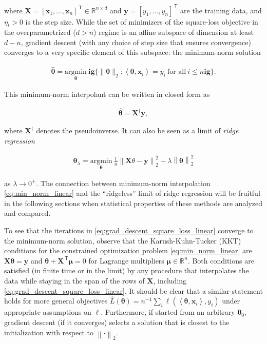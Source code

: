where ${\boldsymbol X} = [{\boldsymbol x}_1,\ldots,{\boldsymbol x}_n]^\ensuremath{{\scriptscriptstyle\mathsf{\,T}}}\in {\mathbb R}^{n\times d}$ and
${\boldsymbol y}=[y_1,\ldots,y_n]^\ensuremath{{\scriptscriptstyle\mathsf{\,T}}}$ are the training data, and $\eta_t>0$ is the step size. While the set of minimizers of the square-loss objective in the overparametrized ($d>n$) regime  is an affine subspace of dimension at least $d-n$, gradient descent (with any choice of step size that ensures convergence) converges to a very specific element of this subspace: the minimum-norm solution

\begin{align}
	\label{eq:min_norm_linear}
	\widehat{{\boldsymbol \theta}} = \underset{{\boldsymbol \theta}}{\mathrm{argmin}} \  \mathbf{ig}\{ \| {\boldsymbol \theta} \|_2: \left\langle {\boldsymbol \theta},{\boldsymbol x}_i \right\rangle = y_i ~\text{for all}~ i \leq n \mathbf{ig}\}.
\end{align}

This minimum-norm interpolant can be written in closed form as

\begin{align}
	\widehat{{\boldsymbol \theta}} = {\boldsymbol X}^\dagger {\boldsymbol y},
\end{align}

	
where ${\boldsymbol X}^\dagger$ denotes the pseudoinverse. It can also be seen as a limit of \emph{ridge regression}

\begin{align}
	\label{eq:reg_least_squares}
	{\boldsymbol \theta}_{\lambda} = \underset{{\boldsymbol \theta}}{\mathrm{argmin}} \  \frac{1}{n}\left\|{\boldsymbol X}\theta-{\boldsymbol y}\right\|^2_2 + \lambda\left\|{\boldsymbol \theta}\right\|^2_2
\end{align}

as $\lambda\to 0^+$. The connection between minimum-norm interpolation \eqref{eq:min_norm_linear} and the ``ridgeless'' limit of ridge regression will be fruitful in the following sections when statistical properties of these methods are analyzed and compared. 

To see that the iterations in
\eqref{eq:grad_descent_square_loss_linear} converge to the minimum-norm solution, observe that the Karush-Kuhn-Tucker (KKT) conditions for the constrained optimization problem \eqref{eq:min_norm_linear} are
${\boldsymbol X} {\boldsymbol \theta} = {\boldsymbol y}$ and ${\boldsymbol \theta}+{\boldsymbol X}^\ensuremath{{\scriptscriptstyle\mathsf{\,T}}} \boldsymbol{\mu} = 0$ for Lagrange multipliers $\boldsymbol{\mu}\in{\mathbb R}^n$. Both conditions are satisfied (in finite time or in the limit) by any procedure that interpolates the data while staying in the span of the rows of ${\boldsymbol X}$, including \eqref{eq:grad_descent_square_loss_linear}.
It should be clear that a similar statement holds for more general objectives $\widehat{L}({\boldsymbol \theta}) = n^{-1}\sum_i
\ell(\left\langle {\boldsymbol \theta},{\boldsymbol x}_i \right\rangle,y_i)$ under appropriate assumptions on
$\ell$. Furthermore, if started from an arbitrary ${\boldsymbol \theta}_0$,
gradient descent (if it converges) selects a solution that is closest to the initialization with respect to $\left\|\cdot\right\|_2$.

